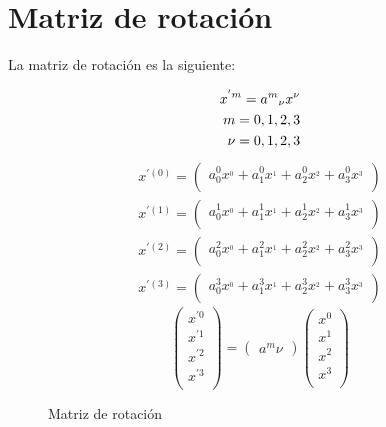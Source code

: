 \section{Matriz de rotaci\'on}
La matriz de rotación es la siguiente:

\begin{figure}[h!]
		\begin{eqnarray*}
			x^{'m} = a^{m}\hfill_{\nu} x^{\nu}\\
			m = 0,1,2,3\\
			\nu = 0,1,2,3
		\end{eqnarray*}		
		\begin{eqnarray*}
			x^{'(0)} =
			\left( {\begin{array}{cc}
					a^{0} _0 x^{_0} + a^{0} _1 x^{_1} + a^{0} _2 x^{_2} + a^{0} _3 x^{_3}\\
			\end{array} } \right)\\
		x^{'(1)} =
		\left( {\begin{array}{cc}
				a^{1} _0 x^{_0} + a^{1} _1 x^{_1} + a^{1} _2 x^{_2} + a^{1} _3 x^{_3}\\
		\end{array} } \right)\\
		x^{'(2)} =
		\left( {\begin{array}{cc}
				a^{2} _0 x^{_0} + a^{2} _1 x^{_1} + a^{2} _2 x^{_2} + a^{2} _3 x^{_3}\\
		\end{array} } \right)\\
		x^{'(3)} =
		\left( {\begin{array}{cc}
				a^{3} _0 x^{_0} + a^{3} _1 x^{_1} + a^{3} _2 x^{_2} + a^{3} _3 x^{_3}\\
		\end{array} } \right)
		\end{eqnarray*}
		\begin{equation*}
			\left(
			\begin{array}{ccc}
				x^{'0}\\
				x^{'1}\\
				x^{'2}\\
				x^{'3}\\ 
			\end{array}
			\right)
			=
			\left(
			\begin{array}{c}
				a^{m}\nu
			\end{array}
			\right)
			{}
			\left(
			\begin{array}{ccc}
				x^{0}\\
				x^{1}\\
				x^{2}\\
				x^{3}\\ 
			\end{array}
			\right)
		\end{equation*}		
	\caption{Matriz de rotaci\'on}
	\label{permutaciones_tree}
\end{figure}